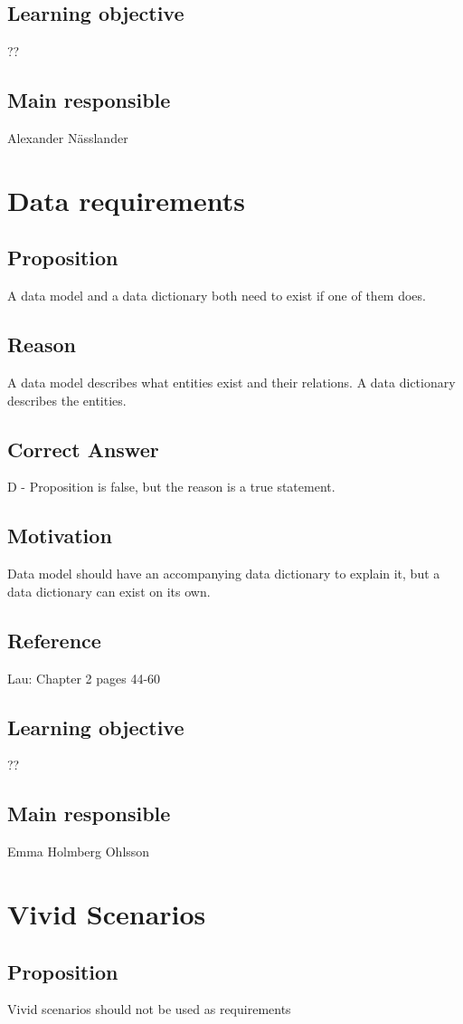 \documentclass[a4paper]{article}
\begin{document}
\subsection{Learning objective}
??
\subsection{Main responsible}
Alexander Nässlander


\section{Data requirements}
\subsection{Proposition}
A data model and a data dictionary both need to exist if one of them does.
\subsection{Reason}
A data model describes what entities exist and their relations. A data dictionary describes the entities.
\subsection{Correct Answer}
D - Proposition is false, but the reason is a true statement.
\subsection{Motivation}
Data model should have an accompanying data dictionary to explain it, but a data dictionary can exist on its own.
\subsection{Reference}
Lau: Chapter 2 pages 44-60
\subsection{Learning objective}
??
\subsection{Main responsible}
Emma Holmberg Ohlsson


\section{Vivid Scenarios}
\subsection{Proposition}
Vivid scenarios should not be used as requirements
\end{document}
